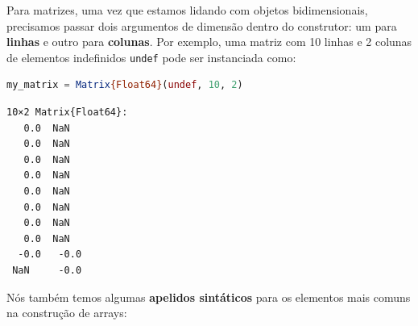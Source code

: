 \documentclass[
  notoc %
]{tufte-book}
\newcommand{\passthrough}[1]{#1}
\begin{document}
Para matrizes, uma vez que estamos lidando com objetos bidimensionais,
precisamos passar dois argumentos de dimensão dentro do construtor: um
para \textbf{linhas} e outro para \textbf{colunas}. Por exemplo, uma
matriz com 10 linhas e 2 colunas de elementos indefinidos
\passthrough{\lstinline!undef!} pode ser instanciada como:

\begin{lstlisting}[language=Julia]
my_matrix = Matrix{Float64}(undef, 10, 2)
\end{lstlisting}

\begin{lstlisting}[language=Output]
10×2 Matrix{Float64}:
   0.0  NaN
   0.0  NaN
   0.0  NaN
   0.0  NaN
   0.0  NaN
   0.0  NaN
   0.0  NaN
   0.0  NaN
  -0.0   -0.0
 NaN     -0.0
\end{lstlisting}

Nós também temos algumas \textbf{apelidos sintáticos} para os elementos
mais comuns na construção de arrays:
\end{document}

